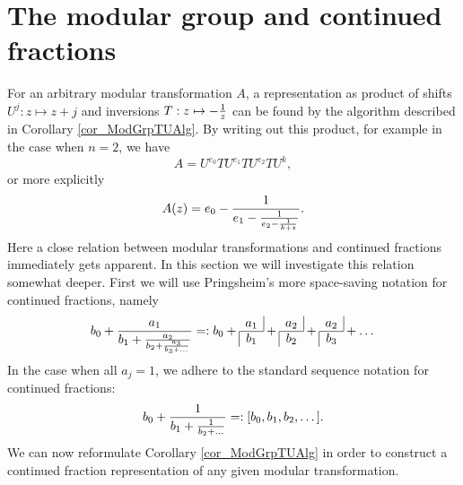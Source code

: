 \section{The modular group and continued fractions}

For an arbitrary modular transformation $A$, a representation as product of shifts $U^j: z \mapsto z+j$ and inversions $T: z \mapsto -\frac{1}{z}$ can be found by the algorithm described in Corollary \ref{cor_ModGrpTUAlg}. By writing out this product, for example in the case when $n=2$, we have
\begin{equation*}
A = U^{e_0}T U^{e_1}T U^{e_2}T U^k,
\end{equation*}
or more explicitly
\begin{equation}
\label{eqn_ALongConFrac}
A(z) = e_0 - \frac{1}{e_1 - \frac{1}{e_2 - \frac{1}{k + z}}}.
\end{equation}
Here a close relation between modular transformations and continued fractions immediately gets apparent. In this section we will investigate this relation somewhat deeper. 
First we will use Pringsheim's more space-saving notation for continued fractions, namely
\begin{equation}
\label{eqn_ConFracNotation}
b_0 + \frac{a_1}{b_1 + \frac{a_2}{b_2 + \frac{a_3}{b_3 + \dots}}} =: 
b_0 + \cfr{a_1}{b_1} + \cfr{a_2}{b_2} + \cfr{a_2}{b_3} + \dots
\end{equation}
In the case when all $a_j = 1$, we adhere to the standard sequence notation for continued fractions:
\begin{equation*}
b_0 + \frac{1}{b_1 + \frac{1}{b_2 + \dots}} =: [b_0,b_1,b_2,\dots].
\end{equation*}
We can now reformulate Corollary \ref{cor_ModGrpTUAlg} in order to construct a continued fraction representation of any given modular transformation.

